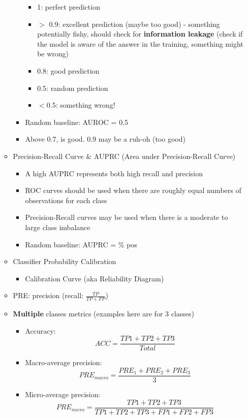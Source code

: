 \documentclass[10pt, oneside]{article}
\begin{document}
\begin{itemize}
\begin{itemize}
\begin{itemize}
\begin{itemize}
                \item 1: perfect prediction
                \item $>$ 0.9: excellent prediction (maybe too good) - something potentially fishy, should check for \textbf{information leakage} (check if the model is aware of the answer in the training, something might be wrong)
                \item 0.8: good prediction
                \item 0.5: random prediction
                \item $<$0.5: something wrong!
            \end{itemize}
            \item Random baseline: AUROC = 0.5
            \item Above 0.7, is good. 0.9 may be a ruh-oh (too good)
        \end{itemize}
        \item Precision-Recall Curve \& AUPRC (Area under Precision-Recall Curve)
        \begin{itemize}
            \item A high AUPRC represents both high recall and precision
            \item ROC curves should be used when there are roughly equal numbers of observations for each class
            \item Precision-Recall curves may be used when there is a moderate to large class imbalance
            \item Random baseline: AUPRC = \% pos
        \end{itemize}
        \item Classifier Probability Calibration
        \begin{itemize}
            \item Calibration Curve (aka Reliability Diagram)
        \end{itemize}
        \item PRE: precision (recall: $\frac{TP}{TP+FP}$)
        \item \textbf{Multiple} classes metrics (examples here are for 3 classes)
        \begin{itemize}
            \item Accuracy: \[ACC = \frac{TP1 + TP2 + TP3}{Total}\]
            \item Macro-average precision: \[PRE_{macro} = \frac{PRE_1 + PRE_2 + PRE_3}{3}\]
            \item Micro-average precision: \[PRE_{micro} = \frac{TP1 + TP2 + TP3}{TP1 + TP2 + TP3 + FP1 + FP2 + FP3}\]

\end{itemize}
\end{itemize}
\end{itemize}
\end{document}
